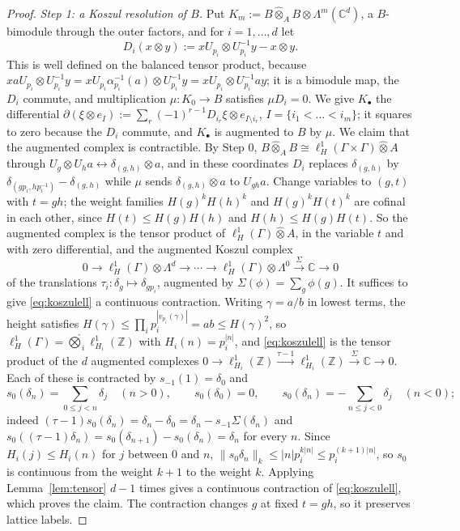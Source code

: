 \documentclass[11pt]{amsart}
\theoremstyle{definition}
\theoremstyle{remark}
\newcommand{\C}{\mathbb C}
\newcommand{\Z}{\mathbb Z}
\begin{document}
\begin{proof}
\emph{Step 1: a Koszul resolution of $B$.}  Put
$K_m:=B\widehat\otimes_AB\otimes\Lambda^{m}(\C^{d})$, a $B$-bimodule through
the outer factors, and for $i=1,\dots,d$ let
\[
D_i(x\otimes y):=xU_{p_i}\otimes U_{p_i}^{-1}y-x\otimes y .
\]
This is well defined on the balanced tensor product, because
$xaU_{p_i}\otimes U_{p_i}^{-1}y=xU_{p_i}\alpha_{p_i}^{-1}(a)\otimes
U_{p_i}^{-1}y=xU_{p_i}\otimes U_{p_i}^{-1}ay$; it is a bimodule map, the
$D_i$ commute, and multiplication $\mu:K_0\to B$ satisfies $\mu D_i=0$.  We
give $K_{\bullet}$ the differential $\partial(\xi\otimes e_I):=
\sum_{r}(-1)^{r-1}D_{i_r}\xi\otimes e_{I\setminus i_r}$,
$I=\{i_1<\dots<i_m\}$; it squares to zero because the $D_i$ commute, and
$K_{\bullet}$ is augmented to $B$ by $\mu$.  We claim that the augmented
complex is contractible.  By Step 0, $B\widehat\otimes_AB
\cong\ell^{1}_{H}(\Gamma\times\Gamma)\widehat\otimes A$ through
$U_g\otimes U_ha\leftrightarrow\delta_{(g,h)}\otimes a$, and in these
coordinates $D_i$ replaces $\delta_{(g,h)}$ by
$\delta_{(gp_i,hp_i^{-1})}-\delta_{(g,h)}$ while $\mu$ sends
$\delta_{(g,h)}\otimes a$ to $U_{gh}a$.  Change variables to $(g,t)$ with
$t=gh$; the weight families $H(g)^kH(h)^k$ and $H(g)^kH(t)^k$ are cofinal in
each other, since $H(t)\le H(g)H(h)$ and $H(h)\le H(g)H(t)$.  So the augmented
complex is the tensor product of $\ell^{1}_{H}(\Gamma)\widehat\otimes A$, in
the variable $t$ and with zero differential, and the augmented Koszul complex
\begin{equation}\label{eq:koszulell}
0\to\ell^{1}_{H}(\Gamma)\otimes\Lambda^{d}\to\cdots\to
\ell^{1}_{H}(\Gamma)\otimes\Lambda^{0}\xrightarrow{\ \Sigma\ }\C\to0
\end{equation}
of the translations $\tau_i:\delta_g\mapsto\delta_{gp_i}$, augmented by
$\Sigma(\phi)=\sum_g\phi(g)$.  It suffices to give \eqref{eq:koszulell} a
continuous contraction.  Writing $\gamma=a/b$ in lowest terms, the height
satisfies $H(\gamma)\le\prod_ip_i^{|v_{p_i}(\gamma)|}=ab\le H(\gamma)^{2}$, so
$\ell^{1}_{H}(\Gamma)=\widehat\bigotimes_i\ell^{1}_{H_i}(\Z)$ with
$H_i(n)=p_i^{|n|}$, and \eqref{eq:koszulell} is the tensor product of the $d$
augmented complexes $0\to\ell^{1}_{H_i}(\Z)\xrightarrow{\tau-1}
\ell^{1}_{H_i}(\Z)\xrightarrow{\Sigma}\C\to0$.  Each of these is contracted
by $s_{-1}(1)=\delta_0$ and
\[
s_0(\delta_n)=\sum_{0\le j<n}\delta_j\quad(n>0),\qquad
s_0(\delta_0)=0,\qquad
s_0(\delta_n)=-\sum_{n\le j<0}\delta_j\quad(n<0);
\]
indeed $(\tau-1)s_0(\delta_n)=\delta_n-\delta_0=\delta_n-s_{-1}\Sigma(\delta_n)$
and $s_0((\tau-1)\delta_n)=s_0(\delta_{n+1})-s_0(\delta_n)=\delta_n$ for
every $n$.  Since $H_i(j)\le H_i(n)$ for $j$ between $0$ and $n$,
$\lVert s_0\delta_n\rVert_k\le|n|p_i^{k|n|}\le p_i^{(k+1)|n|}$, so $s_0$ is
continuous from the weight $k+1$ to the weight $k$.  Applying
Lemma~\ref{lem:tensor} $d-1$ times gives a continuous contraction of
\eqref{eq:koszulell}, which proves the claim.  The contraction changes $g$ at
fixed $t=gh$, so it preserves lattice labels.


\end{proof}
\end{document}
